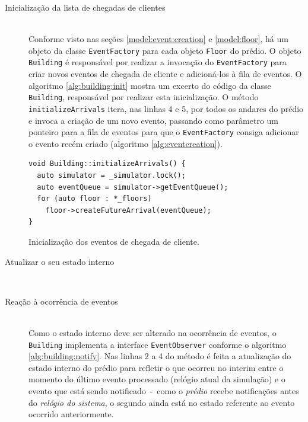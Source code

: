 \begin{description}
  \item[Inicialização da lista de chegadas de clientes] \hfill \\
    Conforme visto nas seções \ref{model:event:creation} e \ref{model:floor}, há
    um objeto da classe \texttt{EventFactory} para cada objeto \texttt{Floor} do
    prédio. O objeto \texttt{Building} é responsável por realizar a invocação do
    \texttt{EventFactory} para criar novos eventos de chegada de cliente e
    adicioná-los à fila de eventos. O algoritmo \ref{alg:building:init} mostra
    um excerto do código da classe \texttt{Building}, responsável por realizar
    esta inicialização. O método \texttt{initializeArrivals} itera, nas linhas 4
    e 5, por todos os andares do prédio e invoca a criação de um novo evento,
    passando como parâmetro um ponteiro para a fila de eventos para que o
    \texttt{EventFactory} consiga adicionar o evento recém criado (algoritmo
    \ref{alg:eventcreation}).

    \begin{algorithm}[htb]
      \centering
        \begin{verbatim}
void Building::initializeArrivals() {
  auto simulator = _simulator.lock();
  auto eventQueue = simulator->getEventQueue();
  for (auto floor : *_floors)
    floor->createFutureArrival(eventQueue);
}
        \end{verbatim}
      \caption{Inicialização dos eventos de chegada de cliente.}
      \label{alg:building:init}
    \end{algorithm}

  \item[Atualizar o seu estado interno] \hfill \\

  \item[Reação à ocorrência de eventos] \hfill \\

    Como o estado interno deve ser alterado na ocorrência de eventos, o
    \texttt{Building} implementa a interface \texttt{EventObserver} conforme o
    algoritmo \ref{alg:building:notify}. Nas linhas 2 a 4 do método é feita a
    atualização do estado interno do prédio para refletir o que ocorreu no
    interim entre o momento do último evento processado (relógio atual da
    simulação) e o evento que está sendo notificado~-~como o \textit{prédio}
    recebe notificações antes do \textit{relógio do sistema}, o segundo ainda
    está no estado referente ao evento ocorrido anteriormente.


\end{description}

